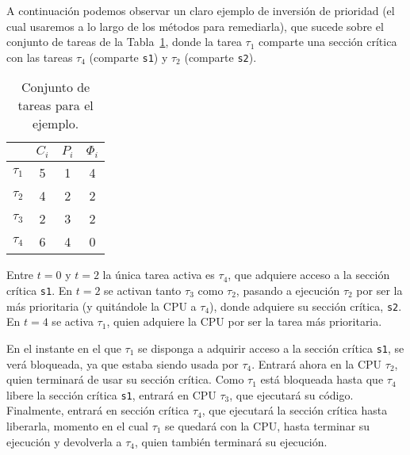 \begin{ejemplo}
    A continuación podemos observar un claro ejemplo de inversión de prioridad (el cual usaremos a lo largo de los métodos para remediarla), que sucede sobre el conjunto de tareas de la Tabla~\ref{tab:tareas_ejm}, donde la tarea $\tau_1$ comparte una sección crítica con las tareas $\tau_4$ (comparte \verb|s1|) y $\tau_2$ (comparte \verb|s2|).
    \begin{table}[H]
    \centering
    \begin{tabular}{|c|c|c|c|}
        \hline
        & $C_i$ & $P_i$ & $\Phi_i$ \\
        \hline
        $\tau_1$ & 5 & 1 & 4 \\
        \hline
        $\tau_2$ & 4 & 2 & 2 \\
        \hline
        $\tau_3$ & 2 & 3 & 2 \\
        \hline
        $\tau_4$ & 6 & 4 & 0 \\
        \hline
    \end{tabular}
    \caption{Conjunto de tareas para el ejemplo.}
    \label{tab:tareas_ejm}
    \end{table}
    Entre $t=0$ y $t=2$ la única tarea activa es $\tau_4$, que adquiere acceso a la sección crítica \verb|s1|. En $t=2$ se activan tanto $\tau_3$ como $\tau_2$, pasando a ejecución $\tau_2$ por ser la más prioritaria (y quitándole la CPU a $\tau_4$), donde adquiere su sección crítica, \verb|s2|. En $t=4$ se activa $\tau_1$, quien adquiere la CPU por ser la tarea más prioritaria.

    En el instante en el que $\tau_1$ se disponga a adquirir acceso a la sección crítica \verb|s1|, se verá bloqueada, ya que estaba siendo usada por $\tau_4$. Entrará ahora en la CPU $\tau_2$, quien terminará de usar su sección crítica. Como $\tau_1$ está bloqueada hasta que $\tau_4$ libere la sección crítica \verb|s1|, entrará en CPU $\tau_3$, que ejecutará su código. Finalmente, entrará en sección crítica $\tau_4$, que ejecutará la sección crítica hasta liberarla, momento en el cual $\tau_1$ se quedará con la CPU, hasta terminar su ejecución y devolverla a $\tau_4$, quien también terminará su ejecución.\\


    \begin{figure}[H]
        \centering
\end{figure}
\end{ejemplo}
